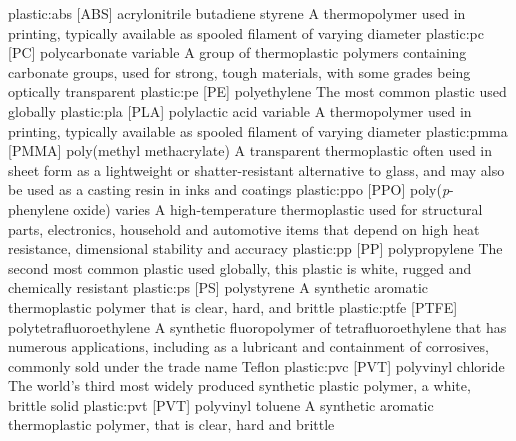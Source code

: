 \newglsXchemical%
{plastic:abs}%
[ABS]%
{acrylonitrile butadiene styrene}%
{}%
{A thermopolymer used in  printing, typically available as spooled filament of varying diameter}%
\newglsXchemical%
{plastic:pc}%
[PC]%
{polycarbonate}%
{variable}%
{A group of thermoplastic polymers containing carbonate groups, used for strong, tough materials, with some grades being optically transparent}%
\newglsXchemical%
{plastic:pe}%
[PE]%
{polyethylene}%
{}%
{The most common plastic used globally}%
\newglsXchemical%
{plastic:pla}%
[PLA]%
{polylactic acid}%
{variable}%
{A thermopolymer used in  printing, typically available as spooled filament of varying diameter}%
\newglsXchemical%
{plastic:pmma}%
[PMMA]%
{poly(methyl methacrylate)}%
{}%
{A transparent thermoplastic often used in sheet form as a lightweight or shatter-resistant alternative to glass, and may also be used as a casting resin in inks and coatings}%
\newglsXchemical%
{plastic:ppo}%
[PPO]%
{poly(\textit{p}{\--}phenylene oxide)}%
{varies}%
{A high{\--}temperature thermoplastic used for structural parts, electronics, household and automotive items that depend on high heat resistance, dimensional stability and accuracy}%
\newglsXchemical%
{plastic:pp}%
[PP]%
{polypropylene}%
{}%
{The second most common plastic used globally, this plastic is white, rugged and chemically resistant}%
\newglsXchemical%
{plastic:ps}%
[PS]%
{polystyrene}%
{}%
{A synthetic aromatic thermoplastic polymer that is clear, hard, and brittle}%
\newglsXchemical%
{plastic:ptfe}%
[PTFE]%
{polytetrafluoroethylene}%
{}%
{A synthetic fluoropolymer of tetrafluoroethylene that has numerous applications, including as a lubricant and containment of corrosives, commonly sold under the trade name Teflon}%
\newglsXchemical%
{plastic:pvc}%
[PVT]%
{polyvinyl chloride}%
{}%
{The world's third most widely produced synthetic plastic polymer, a white, brittle solid}%
\newglsXchemical%
{plastic:pvt}%
[PVT]%
{polyvinyl toluene}%
{}%
{A synthetic aromatic thermoplastic polymer, that is clear, hard and brittle}%
